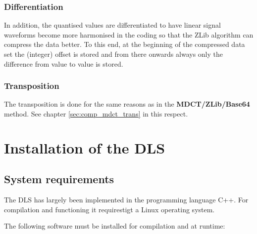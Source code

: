 \documentclass[a4paper,12pt,BCOR6mm,bibtotoc,idxtotoc]{scrbook}
\begin{document}
\subsection{Differentiation}

In addition, the quantised values are differentiated to have linear signal waveforms become more harmonised in the coding so that the ZLib algorithm can compress the data better. To this end, at the beginning of the compressed data set the (integer) offset is stored and from there onwards always only the difference from value to value is stored.

\subsection{Transposition}

The transposition is done for the same reasons as in the \textbf{MDCT/ZLib/Base64} method. See chapter \ref{sec:comp_mdct_trans} in this respect.


\appendix

\chapter{Installation of the DLS} \label{sec:apx_install} 

\section{System requirements}

The DLS has largely been implemented in the programming language C++. For compilation and functioning it requires\-tigt  a Linux operating system.

The following software must be installed for compilation and at runtime:
\end{document}
